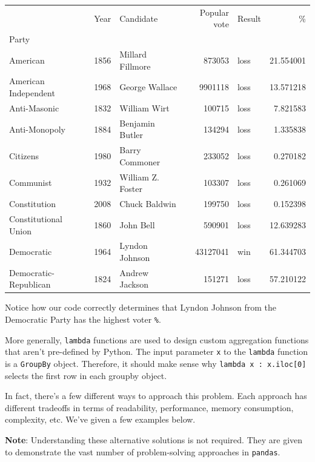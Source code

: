 \documentclass[
  letterpaper,
  DIV=11,
  numbers=noendperiod]{scrreprt}
\begin{document}
\begin{tabular}{lrlrlr}
\toprule
{} &  Year &          Candidate &  Popular vote & Result &          \% \\
Party                 &       &                    &               &        &            \\
\midrule
American              &  1856 &   Millard Fillmore &        873053 &   loss &  21.554001 \\
American Independent  &  1968 &     George Wallace &       9901118 &   loss &  13.571218 \\
Anti-Masonic          &  1832 &       William Wirt &        100715 &   loss &   7.821583 \\
Anti-Monopoly         &  1884 &    Benjamin Butler &        134294 &   loss &   1.335838 \\
Citizens              &  1980 &     Barry Commoner &        233052 &   loss &   0.270182 \\
Communist             &  1932 &  William Z. Foster &        103307 &   loss &   0.261069 \\
Constitution          &  2008 &      Chuck Baldwin &        199750 &   loss &   0.152398 \\
Constitutional Union  &  1860 &          John Bell &        590901 &   loss &  12.639283 \\
Democratic            &  1964 &     Lyndon Johnson &      43127041 &    win &  61.344703 \\
Democratic-Republican &  1824 &     Andrew Jackson &        151271 &   loss &  57.210122 \\
\bottomrule
\end{tabular}

Notice how our code correctly determines that Lyndon Johnson from the
Democratic Party has the highest voter \texttt{\%}.

More generally, \texttt{lambda} functions are used to design custom
aggregation functions that aren't pre-defined by Python. The input
parameter \texttt{x} to the \texttt{lambda} function is a
\texttt{GroupBy} object. Therefore, it should make sense why
\texttt{lambda\ x\ :\ x.iloc{[}0{]}} selects the first row in each
groupby object.

In fact, there's a few different ways to approach this problem. Each
approach has different tradeoffs in terms of readability, performance,
memory consumption, complexity, etc. We've given a few examples below.

\textbf{Note}: Understanding these alternative solutions is not
required. They are given to demonstrate the vast number of
problem-solving approaches in \texttt{pandas}.
\end{document}
